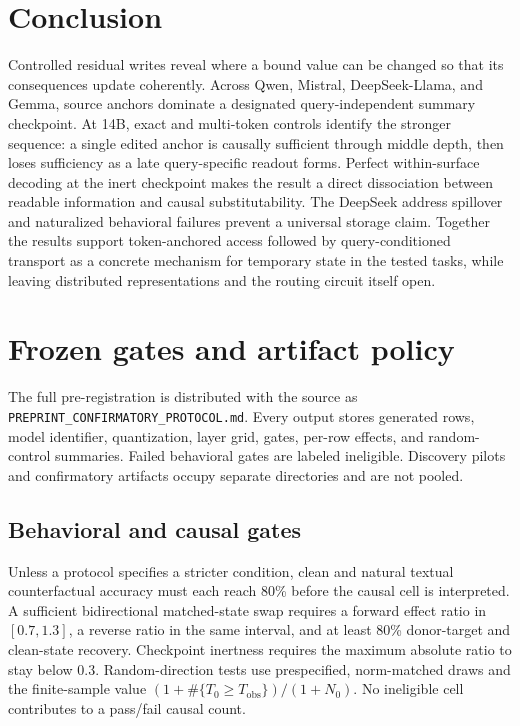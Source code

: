 \documentclass[10pt]{article}
\begin{document}
\section{Conclusion}

Controlled residual writes reveal where a bound value can be changed so that
its consequences update coherently. Across Qwen, Mistral, DeepSeek-Llama, and
Gemma, source anchors dominate a designated query-independent summary
checkpoint. At 14B, exact and multi-token controls identify the stronger
sequence: a single edited anchor is causally sufficient through middle depth,
then loses sufficiency as a late query-specific readout forms. Perfect
within-surface decoding at the inert checkpoint makes the result a direct
dissociation between readable information and causal substitutability. The
DeepSeek address spillover and naturalized behavioral failures prevent a
universal storage claim. Together the results support token-anchored access
followed by query-conditioned transport as a concrete mechanism for temporary
state in the tested tasks, while leaving distributed representations and the
routing circuit itself open.




\appendix
\section{Frozen gates and artifact policy}

The full pre-registration is distributed with the source as
\texttt{PREPRINT\_CONFIRMATORY\_PROTOCOL.md}. Every output stores generated
rows, model identifier, quantization, layer grid, gates, per-row effects, and
random-control summaries. Failed behavioral gates are labeled ineligible.
Discovery pilots and confirmatory artifacts occupy separate directories and
are not pooled.

\subsection{Behavioral and causal gates}

Unless a protocol specifies a stricter condition, clean and natural textual
counterfactual accuracy must each reach 80\% before the causal cell is
interpreted. A sufficient bidirectional matched-state swap requires a forward
effect ratio in $[0.7,1.3]$, a reverse ratio in the same interval, and at least
80\% donor-target and clean-state recovery. Checkpoint inertness requires the
maximum absolute ratio to stay below 0.3. Random-direction tests use
prespecified, norm-matched draws and the finite-sample value
$(1+\#\{T_{0}\geq T_{\mathrm{obs}}\})/(1+N_0)$. No ineligible cell contributes
to a pass/fail causal count.
\end{document}
